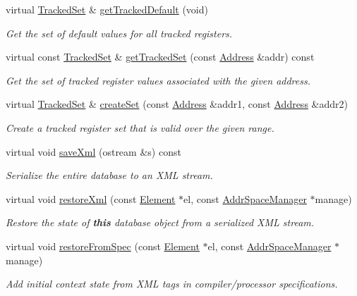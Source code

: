 \begin{DoxyCompactItemize}
virtual \mbox{\hyperlink{globalcontext_8hh_a7559d2c55c5d12fbbaf0418733b62438}{Tracked\+Set}} \& \mbox{\hyperlink{class_context_internal_a38f6d0158f108dd29132250b1cb234b1}{get\+Tracked\+Default}} (void)
\begin{DoxyCompactList}\small\item\em Get the set of default values for all tracked registers. \end{DoxyCompactList}\item 
virtual const \mbox{\hyperlink{globalcontext_8hh_a7559d2c55c5d12fbbaf0418733b62438}{Tracked\+Set}} \& \mbox{\hyperlink{class_context_internal_a0953f0bba2a187d4cd001463c9f667ab}{get\+Tracked\+Set}} (const \mbox{\hyperlink{class_address}{Address}} \&addr) const
\begin{DoxyCompactList}\small\item\em Get the set of tracked register values associated with the given address. \end{DoxyCompactList}\item 
virtual \mbox{\hyperlink{globalcontext_8hh_a7559d2c55c5d12fbbaf0418733b62438}{Tracked\+Set}} \& \mbox{\hyperlink{class_context_internal_aa3e2cdba48dac0da0a63c023b96fd07a}{create\+Set}} (const \mbox{\hyperlink{class_address}{Address}} \&addr1, const \mbox{\hyperlink{class_address}{Address}} \&addr2)
\begin{DoxyCompactList}\small\item\em Create a tracked register set that is valid over the given range. \end{DoxyCompactList}\item 
virtual void \mbox{\hyperlink{class_context_internal_a98a632ce5decb052fdf7057d6b6433ed}{save\+Xml}} (ostream \&s) const
\begin{DoxyCompactList}\small\item\em Serialize the entire database to an X\+ML stream. \end{DoxyCompactList}\item 
virtual void \mbox{\hyperlink{class_context_internal_acaa68fc13719dbed6a06ec20d04bc6bf}{restore\+Xml}} (const \mbox{\hyperlink{class_element}{Element}} $\ast$el, const \mbox{\hyperlink{class_addr_space_manager}{Addr\+Space\+Manager}} $\ast$manage)
\begin{DoxyCompactList}\small\item\em Restore the state of {\bfseries{this}} database object from a serialized X\+ML stream. \end{DoxyCompactList}\item 
virtual void \mbox{\hyperlink{class_context_internal_a1b06379e4ee5c7c3105047737bb4331b}{restore\+From\+Spec}} (const \mbox{\hyperlink{class_element}{Element}} $\ast$el, const \mbox{\hyperlink{class_addr_space_manager}{Addr\+Space\+Manager}} $\ast$manage)
\begin{DoxyCompactList}\small\item\em Add initial context state from X\+ML tags in compiler/processor specifications. \end{DoxyCompactList}\end{DoxyCompactItemize}
